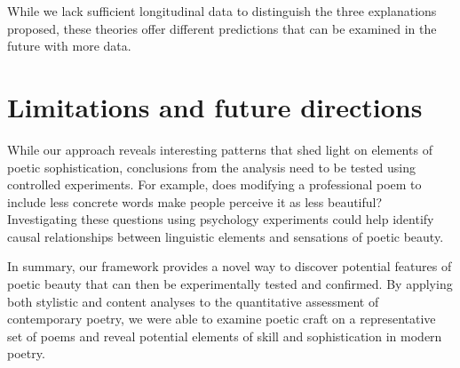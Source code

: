 \documentclass{book}
\begin{document}
While we lack sufficient longitudinal data to distinguish the three explanations proposed, these theories offer different predictions that can be examined in the future with more data. 


\section{Limitations and future directions}

While our approach reveals interesting patterns that shed light on elements of poetic sophistication, conclusions from the analysis need to be tested using controlled experiments. For example, does modifying a professional poem to include less concrete words make people perceive it as less beautiful? Investigating these questions using psychology experiments could help identify causal relationships between linguistic elements and sensations of poetic beauty.

In summary, our framework provides a novel way to discover potential features of poetic beauty that can then be experimentally tested and confirmed. By applying both stylistic and content analyses to the quantitative assessment of contemporary poetry, we were able to examine poetic craft on a representative set of poems and reveal potential elements of skill and sophistication in modern poetry.
\end{document}
